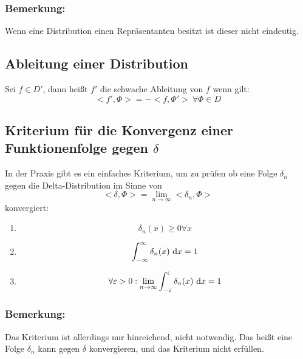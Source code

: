 \subsubsection{Bemerkung:}
Wenn eine Distribution einen Repräsentanten besitzt ist dieser nicht eindeutig.

\subsection{Ableitung einer Distribution}
Sei $f\in D'$, dann heißt $f'$ die schwache Ableitung von
$f$ wenn gilt:
\begin{equation*}
    <f', \Phi> = -<f, \Phi'>\ \forall \Phi \in D
\end{equation*}

\subsection{Kriterium für die Konvergenz einer Funktionenfolge gegen $\delta$}
In der Praxis gibt es ein einfaches Kriterium, um zu prüfen ob eine Folge $\delta_n$ gegen die Delta-Distribution im Sinne von
\begin{equation*}
    <\delta, \Phi> = \lim_{n \to \infty} <\delta_n, \Phi> 
\end{equation*}
konvergiert:
\begin{enumerate}
    \item  
        \begin{equation*}
            \delta_n(x) \geq 0 \forall x 
        \end{equation*}
    \item
        \begin{equation*}
            \int_{-\infty}^\infty \delta_n(x) \text{ d}x = 1      
        \end{equation*}
    \item
        \begin{equation*}
            \forall \varepsilon > 0: \lim_{n \to \infty} \int_{-\varepsilon}^\varepsilon \delta_n(x) \text{ d}x = 1 
        \end{equation*}
\end{enumerate}

\subsubsection{Bemerkung:}
Das Kriterium ist allerdings nur hinreichend, nicht notwendig. Das heißt eine Folge $\delta_n$ kann gegen $\delta$ konvergieren, und das Kriterium nicht erfüllen.

